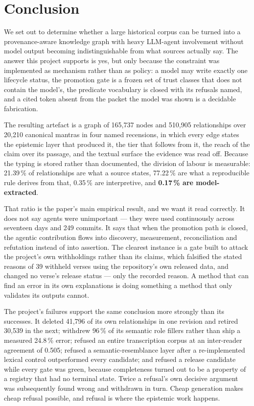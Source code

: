 \section{Conclusion}
\label{sec:conclusion}

We set out to determine whether a large historical corpus can be turned into a
provenance-aware knowledge graph with heavy \mbox{LLM}-agent involvement without
model output becoming indistinguishable from what sources actually say. The answer
this project supports is yes, but only because the constraint was implemented as
mechanism rather than as policy: a model may write exactly one lifecycle status, the
promotion gate is a frozen set of trust classes that does not contain the model's,
the predicate vocabulary is closed with its refusals named, and a cited token absent
from the packet the model was shown is a decidable fabrication.

The resulting artefact is a graph of 165{,}737 nodes and 510{,}905 relationships over
20{,}210 canonical mantras in four named recensions, in which every edge states the
epistemic layer that produced it, the tier that follows from it, the reach of the
claim over its passage, and the textual surface the evidence was read off. Because
the typing is stored rather than documented, the division of labour is measurable:
21.39\,\% of relationships are what a source states, 77.22\,\% are what a
reproducible rule derives from that, 0.35\,\% are interpretive, and \textbf{0.17\,\%
are model-extracted}.

That ratio is the paper's main empirical result, and we want it read correctly. It
does not say agents were unimportant --- they were used continuously across
seventeen days and 249 commits. It says that when the promotion path is closed, the
agentic contribution flows into discovery, measurement, reconciliation and
refutation instead of into assertion. The clearest instance is a gate built to
attack the project's own withholdings rather than its claims, which falsified the
stated reasons of 39 withheld verses using the repository's own released data, and
changed no verse's release status --- only the recorded reason. A method that can
find an error in its own explanations is doing something a method that only validates
its outputs cannot.

The project's failures support the same conclusion more strongly than its successes.
It deleted 41{,}796 of its own relationships in one revision and retired 30{,}539 in
the next; withdrew 96\,\% of its semantic role fillers rather than ship a measured
24.8\,\% error; refused an entire transcription corpus at an inter-reader agreement
of 0.505; refused a semantic-resemblance layer after a re-implemented lexical control
outperformed every candidate; and refused a release candidate while every gate was
green, because completeness turned out to be a property of a registry that had no
terminal state. Twice a refusal's own decisive argument was subsequently found wrong
and withdrawn in turn. Cheap generation makes cheap refusal possible, and refusal is
where the epistemic work happens.


